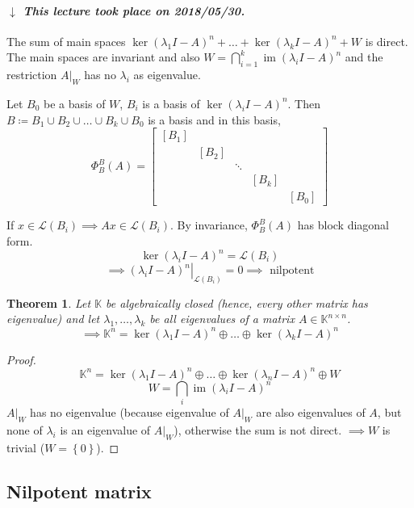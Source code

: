 \documentclass{article}
\newcounter{lecref}[section]
\numberwithin{lecref}{section}
\newtheorem{theorem}[lecref]{Theorem}
\newcommand{\set}[1]{\left\{#1\right\}}
\newcommand{\dateref}[1]{%
  \begin{mdframed}[backgroundcolor=gray!10,innerbottommargin=0pt,innertopmargin=0pt]
    \paragraph{\textit{$\downarrow$ This lecture took place on #1.}}%
  \end{mdframed}%
}
\DeclareMathOperator{\im}{im}
\begin{document}
\dateref{2018/05/30}

The sum of main spaces $\ker(\lambda_1 I - A)^n + \dots + \ker(\lambda_k I - A)^n + W$ is direct.
The main spaces are invariant and also $W = \bigcap_{i=1}^k \im(\lambda_i I - A)^n$ and the
restriction $A|_W$ has no $\lambda_i$ as eigenvalue.

Let $B_0$ be a basis of $W$, $B_i$ is a basis of $\ker(\lambda_i I - A)^n$.
Then $B \coloneqq B_1 \cup B_2 \cup \dots \cup B_k \cup B_0$ is a basis and in this basis,
\[
  \Phi_B^B(A) = \begin{bmatrix}
    [B_1] &       &        &       &       \\
          & [B_2] &        &       &       \\
          &       & \ddots &       &       \\
          &       &        & [B_k] &       \\
          &       &        &       & [B_0]
  \end{bmatrix}
\]

If $x \in \mathcal L(B_i) \implies Ax \in \mathcal L(B_i)$.
By invariance, $\Phi_B^B(A)$ has block diagonal form.
\[ \ker(\lambda_i I - A)^n = \mathcal L(B_i) \]
\[ \implies \left. (\lambda_i I - A)^n \right|_{\mathcal L(B_i)} = 0 \implies \text{ nilpotent} \]

\begin{theorem} %
  \label{thm:1115}
  Let $\mathbb K$ be algebraically closed (hence, every other matrix has eigenvalue)
  and let $\lambda_1, \dots, \lambda_k$ be all eigenvalues of a matrix $A \in \mathbb K^{n\times n}$.
  \[ \implies \mathbb K^{n} = \ker(\lambda_1 I - A)^n \oplus \dots \oplus \ker(\lambda_k I - A)^n \]
\end{theorem}

\begin{proof}
  \[ \mathbb K^n = \ker(\lambda_1 I - A)^n \oplus \dots \oplus \ker(\lambda_n I - A)^n \oplus W \]
  \[ W = \bigcap_i \im(\lambda_i I - A)^n \]
  $A|_W$ has no eigenvalue (because eigenvalue of $A|_W$ are also eigenvalues of $A$, but none of $\lambda_i$ is an eigenvalue of $A|_W$), otherwise the sum is not direct.
  $\implies W$ is trivial ($W = \set{0}$).
\end{proof}

\subsection{Nilpotent matrix}
\end{document}
